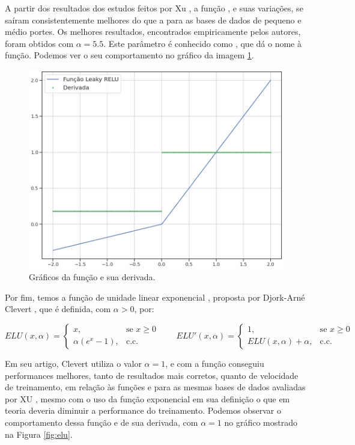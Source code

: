 A partir dos resultados dos estudos feitos por Xu \citep{xu_relu}, a função , e suas variações, se saíram consistentemente melhores do que a  para as bases de dados de pequeno e médio portes. Os melhores resultados, encontrados empiricamente pelos autores, foram obtidos com $\alpha = 5.5$. Este parâmetro é conhecido como , que dá o nome à função. Podemos ver o seu comportamento no gráfico da imagem \ref{fig:l_relu}.

\begin{figure}[htb]
\centering
\includegraphics[width=12cm]{figuras/l_relu}
\caption{Gráficos da função  e sua derivada.}
\label{fig:l_relu}
\end{figure}

Por fim, temos a função de unidade linear exponencial , proposta por Djork-Arné Clevert \citep{clevert}, que é definida, com $\alpha > 0$, por:

\[
ELU(x, \alpha)=
	\begin{cases}
    	x, & \text{se } x\ge 0\\
    	\alpha(e^x - 1), & \text{c.c.}
	\end{cases}
\quad \quad
ELU'(x, \alpha)=
	\begin{cases}
    	1, & \text{se } x\ge 0\\
    	ELU(x, \alpha)+\alpha, & \text{c.c.}
	\end{cases} 
\]

Em seu artigo, Clevert \citep{clevert} utiliza o valor $\alpha = 1$, e com a função  conseguiu performances melhores, tanto de resultados mais corretos, quanto de velocidade de treinamento, em relação às funções  e  para as mesmas bases de dados avaliadas por XU \citep{xu_relu}, mesmo com o uso da função exponencial em sua definição o que em teoria deveria diminuir a performance do treinamento. Podemos observar o comportamento dessa função e de sua derivada, com $\alpha = 1$ no gráfico mostrado na Figura \ref{fig:elu}.

